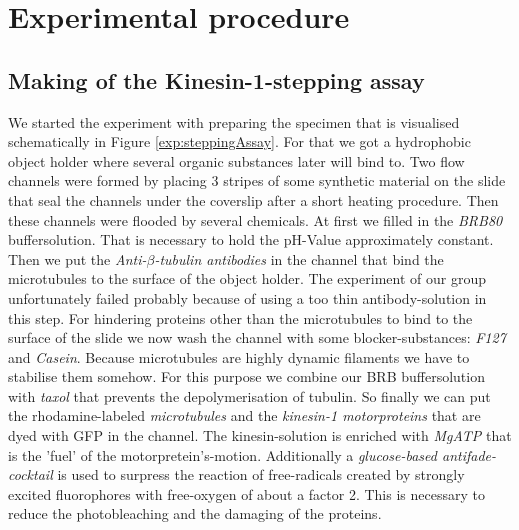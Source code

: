 \section{Experimental procedure}
	\subsection{Making of the Kinesin-1-stepping assay}
	
		
		We started the experiment with preparing the specimen that is visualised schematically in Figure \ref{exp:steppingAssay}. For that we got a hydrophobic object holder where several organic substances later will bind to. Two flow channels were formed by placing 3 stripes of some synthetic material on the slide that seal the channels under the coverslip after a short heating procedure. Then these channels were flooded by several chemicals. At first we filled in the \textit{BRB80} buffersolution. That is necessary to hold the pH-Value approximately constant. Then we put the \textit{Anti-$\beta$-tubulin antibodies} in the channel that bind the microtubules to the surface of the object holder. The experiment of our group unfortunately failed probably because of using a too thin antibody-solution in this step. For hindering proteins other than the microtubules to bind to the surface of the slide we now wash the channel with some blocker-substances: \textit{F127} and \textit{Casein}. Because microtubules are highly dynamic filaments we have to stabilise them somehow. For this purpose we combine our BRB buffersolution with \textit{taxol} that prevents the depolymerisation of tubulin. So finally we can put the rhodamine-labeled \textit{microtubules} and the \textit{kinesin-1 motorproteins} that are dyed with GFP in the channel. The kinesin-solution is enriched with \textit{MgATP} that is the 'fuel' of the motorpretein's-motion. Additionally a \textit{glucose-based antifade-cocktail} is used to surpress the reaction of free-radicals created by strongly excited fluorophores with free-oxygen of about a factor 2. This is necessary to reduce the photobleaching and the damaging of the proteins.
